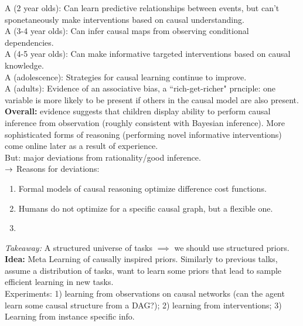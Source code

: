 A (2 year olds): Can learn predictive relationships between events, but can't sponetaneously make interventions based on causal understanding. \\

A (3-4 year olds): Can infer causal maps from observing conditional dependencies. \\

A (4-5 year olds): Can make informative targeted interventions based on causal knowledge. \\

A (adolescence): Strategies for causal learning continue to improve. \\

A (adults): Evidence of an associative bias, a ``rich-get-richer" prnciple: one variable is more likely to be present if others in the causal model are also present. \\

{\bf Overall:} evidence suggests that children display ability to perform causal inference from observation (roughly consistent with Bayesian inference). More sophisticated forms of reasoning (performing novel informative interventions) come online later as a result of experience. \\

But: major deviations from rationality/good inference. \\

$\rightarrow$ Reasons for deviations:
\begin{enumerate}
    \item Formal models of causal reasoning optimize difference cost functions.
    \item Humans do not optimize for a specific causal graph, but a flexible one.
    \item 
\end{enumerate}

{\it Takeaway:} A structured universe of tasks $\implies$ we should use structured priors. \\

{\bf Idea:} Meta Learning of causally inspired priors. Similarly to previous talks, assume a distribution of tasks, want to learn some priors that lead to sample efficient learning in new tasks. \\

Experiments: 1) learning from observations on causal networks (can the agent learn some causal structure from a DAG?); 2) learning from interventions; 3) Learning from instance specific info. \\

